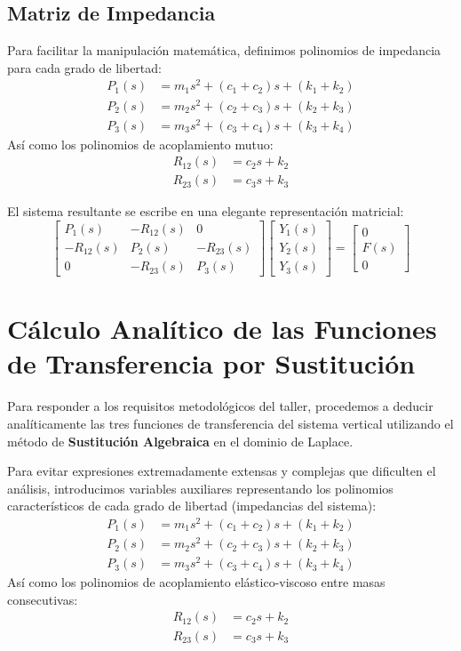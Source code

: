 \documentclass[12pt,letterpaper]{article}
\begin{document}
\subsection{Matriz de Impedancia}
Para facilitar la manipulación matemática, definimos polinomios de impedancia para cada grado de libertad:
\begin{align}
P_1(s) &= m_1 s^2 + (c_1 + c_2)s + (k_1 + k_2) \\
P_2(s) &= m_2 s^2 + (c_2 + c_3)s + (k_2 + k_3) \\
P_3(s) &= m_3 s^2 + (c_3 + c_4)s + (k_3 + k_4)
\end{align}
Así como los polinomios de acoplamiento mutuo:
\begin{align}
R_{12}(s) &= c_2 s + k_2 \\
R_{23}(s) &= c_3 s + k_3
\end{align}

El sistema resultante se escribe en una elegante representación matricial:
\begin{equation}
\begin{bmatrix}
P_1(s) & -R_{12}(s) & 0 \\
-R_{12}(s) & P_2(s) & -R_{23}(s) \\
0 & -R_{23}(s) & P_3(s)
\end{bmatrix}
\begin{bmatrix}
Y_1(s) \\
Y_2(s) \\
Y_3(s)
\end{bmatrix}
=
\begin{bmatrix}
0 \\
F(s) \\
0
\end{bmatrix}
\label{eq:sistema_matricial}
\end{equation}

\section{Cálculo Analítico de las Funciones de Transferencia por Sustitución}
Para responder a los requisitos metodológicos del taller, procedemos a deducir analíticamente las tres funciones de transferencia del sistema vertical utilizando el método de \textbf{Sustitución Algebraica} en el dominio de Laplace.

Para evitar expresiones extremadamente extensas y complejas que dificulten el análisis, introducimos variables auxiliares representando los polinomios característicos de cada grado de libertad (impedancias del sistema):
\begin{align}
P_1(s) &= m_1 s^2 + (c_1 + c_2)s + (k_1 + k_2) \\
P_2(s) &= m_2 s^2 + (c_2 + c_3)s + (k_2 + k_3) \\
P_3(s) &= m_3 s^2 + (c_3 + c_4)s + (k_3 + k_4)
\end{align}
Así como los polinomios de acoplamiento elástico-viscoso entre masas consecutivas:
\begin{align}
R_{12}(s) &= c_2 s + k_2 \\
R_{23}(s) &= c_3 s + k_3
\end{align}
\end{document}
